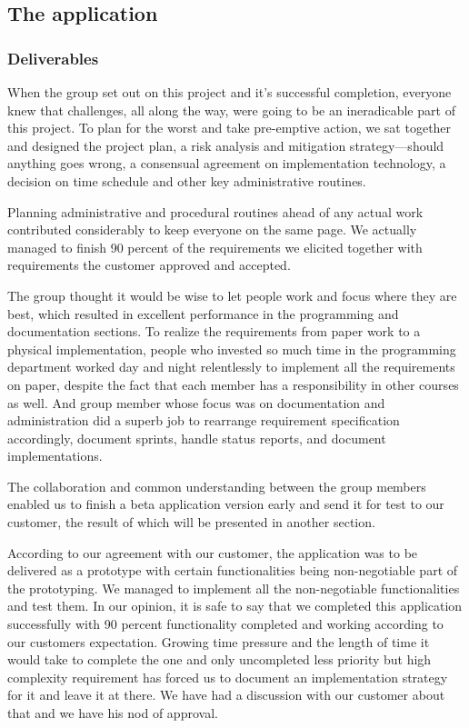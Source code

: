 \subsection{The application}
	
    \subsubsection{Deliverables}
    When the group set out on this project and it's successful completion, everyone knew that challenges, all along the way, were going to be an ineradicable part of this project. To plan for the worst and take pre-emptive action, we sat together and designed the project plan, a risk analysis and mitigation strategy---should anything goes wrong, a consensual agreement on implementation technology, a decision on time schedule and other key administrative routines.

    Planning administrative and procedural routines ahead of any actual work contributed considerably to keep everyone on the same page. We actually managed to finish 90 percent of the requirements we elicited together with requirements the customer approved and accepted.

    The group thought it would be wise to let people work and focus where they are best, which resulted in excellent performance in the programming and documentation sections. To realize the requirements from paper work to a physical implementation, people who invested so much time in the programming department worked day and night relentlessly to implement all the requirements on paper, despite the fact that each member has a responsibility in other courses as well. And group member whose focus was on documentation and administration did a superb job to rearrange requirement specification accordingly, document sprints, handle status reports, and document implementations.

    The collaboration and common understanding between the group members enabled us to finish a beta application version early and send it for test to our customer, the result of which will be presented in another section.

    According to our agreement with our customer, the application was to be delivered as a prototype with certain functionalities being non-negotiable part of the prototyping. We managed to implement all the non-negotiable functionalities and test them. In our opinion, it is safe to say that we completed this application successfully with 90 percent functionality completed and working according to our customers expectation. Growing time pressure and the length of time it would take to complete the one and only uncompleted less priority but high complexity requirement has forced us to document an implementation strategy for it and leave it at there. We have had a discussion with our customer about that and we have his nod of approval.

